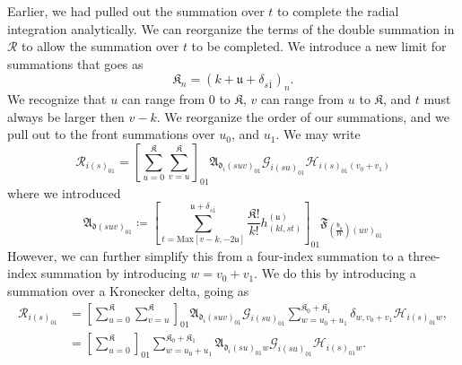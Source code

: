 Earlier, we had pulled out the summation over $t$ to complete the radial
integration analytically. We can reorganize the terms of the double summation in
$\mathcal{R}$ to allow the summation over $t$ to be completed. We introduce a
new limit for summations that goes as
\begin{equation}
    \mathfrak{K}_{n} = \left(k + \mathfrak{u} + \delta_{s\bar{1}}\right)_{n}.
\end{equation}
We recognize that $u$ can range from $0$ to $\mathfrak{K}$, $v$ can range from
$u$ to $\mathfrak{K}$, and $t$ must always be larger then $v-k$. We reorganize
the order of our summations, and we pull out to the front summations over
$u_{0}$, and $u_{1}$. We may write
\begin{equation}
\bm{\mathcal{R}}_{i\left(s\right)_{01}}
    =
        \left[
            \sum_{u=0}^{\mathfrak{K}}
            \sum_{v=u}^{\mathfrak{K}}
        \right]_{01}
        \mathfrak{A}_{\mathfrak{d}_{i}\left(suv\right)_{01}}
        \bm{\mathcal{G}}_{i\left(su\right)_{01}}
        \bm{\mathcal{H}}_{i\left(s\right)_{01}\left(v_{0}+v_{1}\right)}
\end{equation}
where we introduced
\begin{equation}
\mathfrak{A}_{\mathfrak{d}\left(suv\right)_{01}}
    \coloneqq
        \left[
            \sum
            _{t=\text{Max}\left[v-k,-2\mathfrak{u}\right]}
            ^{\mathfrak{u}+\delta_{s\bar{1}}}
            \frac{\mathfrak{K}!}{k!}
            h^{\left(\mathfrak{u}\right)}_{\left(kl,st\right)}
        \right]_{01}
        \mathfrak{F}_{
            \left(\frac{\mathfrak{h}_{\mathfrak{d}}}{W}\right)
            \left(uv\right)_{01}
        }
\end{equation}
However, we can further simplify this from a four-index summation to a
three-index summation by introducing $w = v_{0}+v_{1}$. We do this by
introducing a summation over a Kronecker delta, going as
\begin{align}
\bm{\mathcal{R}}_{i\left(s\right)_{01}}
    &=
        \left[
            \sum_{u=0}^{\mathfrak{K}}
            \sum_{v=u}^{\mathfrak{K}}
        \right]_{01}
        \mathfrak{A}_{\mathfrak{d}_{i}\left(suv\right)_{01}}
        \bm{\mathcal{G}}_{i\left(su\right)_{01}}
        \sum_{w=u_{0}+u_{1}}^{\mathfrak{K}_{0}+\mathfrak{K}_{1}}
        \delta_{w,v_{0}+v_{1}}
        \bm{\mathcal{H}}_{i\left(s\right)_{01}w}
,\\
    &=
        \left[ \sum_{u=0}^{\mathfrak{K}} \right]_{01}
        \sum_{w=u_{0}+u_{1}}^{\mathfrak{K}_{0}+\mathfrak{K}_{1}}
        \mathfrak{A}_{\mathfrak{d}_{i}\left(su\right)_{01}w}
        \bm{\mathcal{G}}_{i\left(su\right)_{01}}
        \bm{\mathcal{H}}_{i\left(s\right)_{01}w}
\label{equation:radial-integral}
.
\end{align}
